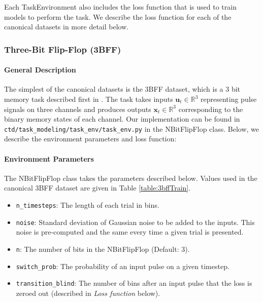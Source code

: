 \documentclass{article}
\begin{document}
Each TaskEnvironment also includes the loss function that is used to train models to perform the task. We describe the loss function for each of the canonical datasets in more detail below.

\clearpage
\subsubsection{Three-Bit Flip-Flop (3BFF)}
\paragraph{General Description}
The simplest of the canonical datasets is the 3BFF dataset, which is a 3 bit memory task described first in \cite{sussillo_opening_2013}. The task takes inputs $\mathbf{u}_t \in \mathbb{R}^3$ representing pulse signals on three channels and produces outputs $\mathbf{x}_t \in \mathbb{R}^3$ corresponding to the binary memory states of each channel. Our implementation can be found in \texttt{ctd/task\_modeling/task\_env/task\_env.py} in the NBitFlipFlop class. Below, we describe the environment parameters and loss function:


\paragraph{Environment Parameters}
The NBitFlipFlop class takes the parameters described below. Values used in the canonical 3BFF dataset are given in Table \ref{table:3bffTrain}.
\begin{itemize}
    \item \texttt{n\_timesteps}: The length of each trial in bins.
    \item \texttt{noise}: Standard deviation of Gaussian noise to be added to the inputs. This noise is pre-computed and the same every time a given trial is presented.
    \item \texttt{n}: The number of bits in the NBitFlipFlop (Default: 3).
    \item \texttt{switch\_prob}: The probability of an input pulse on a given timestep.
    \item \texttt{transition\_blind}: The number of bins after an input pulse that the loss is zeroed out (described in \textit{Loss function} below).
\end{itemize}
\end{document}
